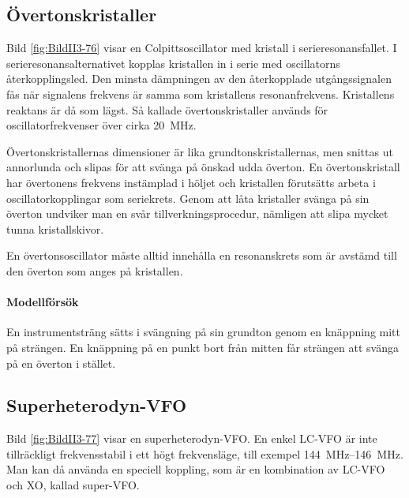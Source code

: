 \subsection{Övertonskristaller}


Bild \ref{fig:BildII3-76} visar en Colpittsoscillator med kristall i
serieresonansfallet.
I serieresonansalternativet kopplas kristallen in i serie med
oscillatorns återkopplingsled.
Den minsta dämpningen av den återkopplade utgångssignalen fås när signalens
frekvens är samma som kristallens resonanfrekvens.
Kristallens reaktans är då som lägst.
Så kallade övertonskristaller används för oscillatorfrekvenser över cirka
\SI{20}{\mega\hertz}.

Övertonskristallernas dimensioner är lika grundtonskristallernas, men
snittas ut annorlunda och slipas för att svänga på önskad udda överton.
En övertonskristall har övertonens frekvens instämplad i höljet och kristallen
förutsätts arbeta i oscillatorkopplingar som seriekrets.
Genom att låta kristaller svänga på sin överton undviker man en svår
tillverkningsprocedur, nämligen att slipa mycket tunna kristallskivor.

En övertonsoscillator måste alltid innehålla en resonanskrets som är
avstämd till den överton som anges på kristallen.

\paragraph{Modellförsök}
En instrumentsträng sätts i svängning på sin grundton genom en knäppning mitt
på strängen.
En knäppning på en punkt bort från mitten får strängen att svänga på en överton
i stället.

\subsection{Superheterodyn-VFO}
\label{superVFO}


Bild \ref{fig:BildII3-77} visar en superheterodyn-VFO.
En enkel LC-VFO är inte tillräckligt frekvensstabil i ett högt frekvensläge,
till exempel \SIrange{144}{146}{\mega\hertz}.
Man kan då använda en speciell koppling, som är en kombination av LC-VFO och
XO, kallad super-VFO.

